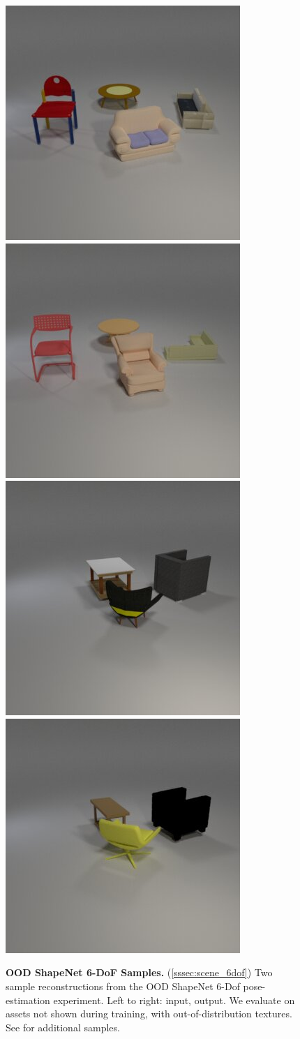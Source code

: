 \begin{figure}[t]
\centering
\includegraphics[width=0.2475\linewidth]{figures/shapenet/OOD/0_in.jpg}\hfill
\includegraphics[width=0.2475\linewidth]{figures/shapenet/OOD/0_out.jpg}\hfill
\includegraphics[width=0.2475\linewidth]{figures/shapenet/OOD/1_in.jpg}\hfill
\includegraphics[width=0.2475\linewidth]{figures/shapenet/OOD/1_out.jpg}
\caption{\textbf{OOD ShapeNet 6-DoF Samples.} (\cref{sssec:scene_6dof})
Two sample reconstructions from the OOD ShapeNet 6-Dof pose-estimation experiment.
Left to right: input, output.
We evaluate on assets not shown during training, with out-of-distribution textures.
See  for additional samples.
}
\label{fig:scene_6dof_ood_samples}
\end{figure}